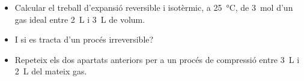 \begin{exr}
    \begin{itemize}
        \item Calcular el treball d'expansió reversible i isotèrmic, a \qty{25}{\celsius}, de \qty{3}{\mol} d'un gas ideal entre \qty{2}{\liter} i \qty{3}{\liter} de volum.
        \item I si es tracta d'un procés irreversible?
        \item Repeteix els dos apartats anteriors per a un procés de compressió entre \qty{3}{\liter} i \qty{2}{\liter} del mateix gas.
    \end{itemize}
    \end{exr}
    